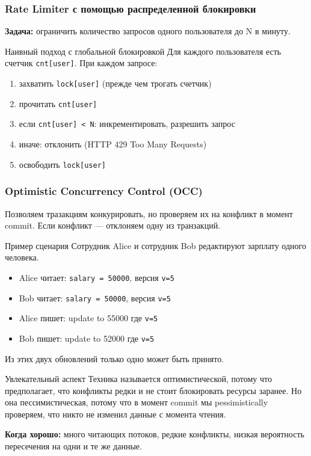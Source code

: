 \documentclass{beamer}
\begin{document}
\begin{frame}
\frametitle{Rate Limiter с помощью распределенной блокировки}

\textbf{Задача:} ограничить количество запросов одного пользователя до N в минуту.

\begin{block}{Наивный подход с глобальной блокировкой}
Для каждого пользователя есть счетчик \texttt{cnt[user]}. При каждом запросе:
\begin{enumerate}
\item захватить \texttt{lock[user]} (прежде чем трогать счетчик)
\item прочитать \texttt{cnt[user]}
\item если \texttt{cnt[user] < N}: инкрементировать, разрешить запрос
\item иначе: отклонить (HTTP 429 Too Many Requests)
\item освободить \texttt{lock[user]}
\end{enumerate}
\end{block}

\end{frame}

\begin{frame}
\frametitle{Optimistic Concurrency Control (OCC)}

Позволяем тразакциям конкурировать, но проверяем их на конфликт в момент commit. Если конфликт — отклоняем одну из транзакций.

\begin{block}{Пример сценария}
Сотрудник Alice и сотрудник Bob редактируют зарплату одного человека.
\begin{itemize}
\item Alice читает: \texttt{salary = 50000}, версия \texttt{v=5}
\item Bob читает: \texttt{salary = 50000}, версия \texttt{v=5}
\item Alice пишет: update to 55000 где \texttt{v=5}
\item Bob пишет: update to 52000 где \texttt{v=5}
\end{itemize}
Из этих двух обновлений только одно может быть принято.
\end{block}

\vspace{0.2cm}

\begin{block}{Увлекательный аспект}\tiny
Техника называется оптимистической, потому что предполагает, что конфликты редки и не стоит блокировать ресурсы заранее.
Но она пессимистическая, потому что в момент commit мы pessimistically проверяем, что никто не изменил данные с момента чтения.
\end{block}

\vspace{0.2cm}

\textbf{Когда хорошо:} много читающих потоков, редкие конфликты, низкая вероятность пересечения на одни и те же данные.

\end{frame}
\end{document}
